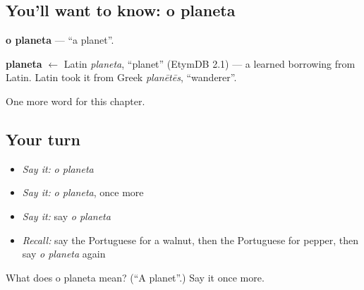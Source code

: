 \subsection*{You'll want to know: o planeta}
\textbf{o planeta} — \textquotedblleft{}a planet\textquotedblright{}.

\begin{cousinweb}
\textbf{planeta} $\leftarrow$ Latin \emph{planeta}, \textquotedblleft{}planet\textquotedblright{} (EtymDB 2.1) — a learned borrowing from Latin. Latin took it from Greek \emph{planētēs}, \textquotedblleft{}wanderer\textquotedblright{}.
\end{cousinweb}

\begin{grammarlens}[title={What you've built}]
One more word for this chapter.
\end{grammarlens}

\subsection*{Your turn}
\begin{itemize}
\raggedright
  \item \emph{Say it:} \emph{o planeta}
  \item \emph{Say it:} \emph{o planeta}, once more
  \item \emph{Say it:} say \emph{o planeta}
  \item \emph{Recall:} say the Portuguese for a walnut, then the Portuguese for pepper, then say \emph{o planeta} again
\end{itemize}

\begin{tcolorbox}[breakable,colback=teal!4,colframe=teal!35!black,title={Before you move on}]
What does o planeta mean? (\textquotedblleft{}A planet\textquotedblright{}.) Say it once more.
\end{tcolorbox}
